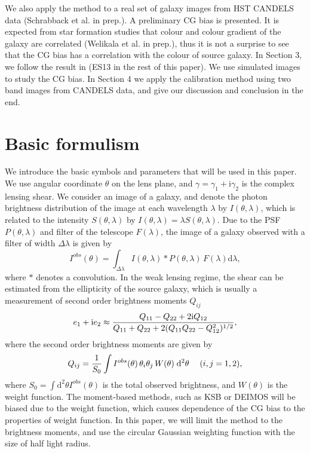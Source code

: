 \documentclass[useAMS,usenatbib]{mn2e}
\renewcommand{\d}{\mathrm{d}}
\newcommand{\ii}{\mathrm{i}}
\newcommand{\be}{\begin{equation}}
\newcommand{\ee}{\end{equation}}
\def\elabel#1{\label{eq:#1}}
\begin{document}
We also apply the method to a real set of galaxy images from HST
CANDELS data (Schrabback et al. in prep.). A preliminary CG bias is
presented. It is expected from star formation studies that colour and
colour gradient of the galaxy are correlated (Welikala et al. in prep.), thus it
is not a surprise to see that the CG bias has a correlation with the
colour of source galaxy. In Section 3, we follow the result in
\citet{2013MNRAS.432.2385S}(ES13 in the rest of this paper). We use
simulated images to study the CG bias. In Section 4 we apply the
calibration method using two band images from CANDELS data, and give
our discussion and conclusion in the end.


\section{Basic formulism}
We introduce the basic symbols and parameters that will be used in
this paper.  We use angular coordinate $\theta$ on the lens plane, and
$\gamma=\gamma_1 + \ii \gamma_2$ is the complex lensing shear. We
consider an image of a galaxy, and denote the photon brightness
distribution of the image at each wavelength $\lambda$ by
$I(\theta,\lambda)$, which is related to the intensity
$S(\theta,\lambda)$ by $I(\theta,\lambda)=\lambda S(\theta,\lambda)$.
Due to the PSF $P(\theta,\lambda)$ and filter of the telescope
$F(\lambda)$, the image of a galaxy observed with a filter of width
$\Delta \lambda$ is given by
%
\be
I^{obs}(\theta) = \int_{\Delta\lambda} I(\theta, \lambda) *  P(\theta,\lambda)
\, F(\lambda)\d \lambda,
\elabel{iobs}
\ee
%
where $*$ denotes a convolution. In the weak lensing regime, the
shear can be estimated from the ellipticity of the source galaxy,
which is usually a measurement of second order brightness moments
$Q_{ij}$ \citep{2001PhR...340..291B}
%
\be
e_1+\ii e_2 \approx
{Q_{11} - Q_{22} + 2 \ii Q_{12} \over Q_{11} + Q_{22} +2(Q_{11}Q_{22} - Q_{12}^2)^{1/2} },
\elabel{mshear}
\ee
%
where the second order brightness moments are given by
%
\be
Q_{ij} = {1 \over S_0} \int  I^{obs}(\theta)\, \theta_i \theta_j \, W(\theta)\; \d^2 \theta \quad\; (i,j=1,2),
\ee
%
where $S_0=\int \d^2\theta I^{obs}(\theta)$ is the total observed
brightness, and $W(\theta)$ is the weight function. The moment-based
methods, such as KSB \citep{1995ApJ...449..460K} or DEIMOS
\citep{2011MNRAS.412.1552M} will be biased due to the weight function,
which causes dependence of the CG bias to the properties of weight
function.  In this paper, we will limit the method to the brightness
moments, and use the circular Gaussian weighting function with the
size of half light radius.
\end{document}

